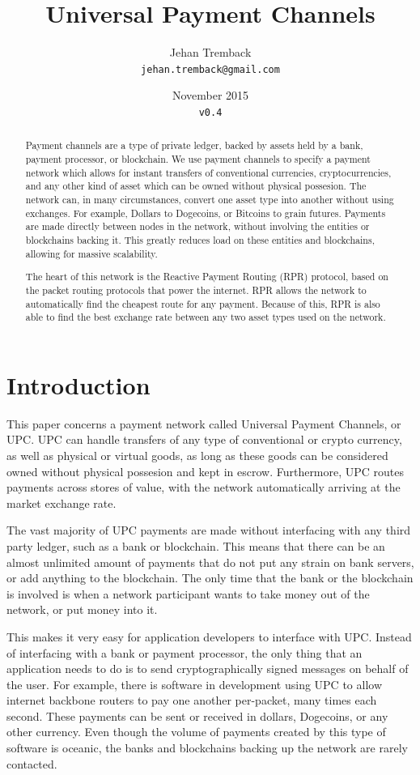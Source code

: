 \documentclass[a4paper]{article}
\title{Universal Payment Channels}
\author{Jehan Tremback\\
\texttt{jehan.tremback@gmail.com}\\}
\date{November 2015\\
\texttt{v0.4}}
\begin{document}
\maketitle

\begin{abstract}
Payment channels are a type of private ledger, backed by assets held by a bank, payment processor, or blockchain. We use payment channels to specify a payment network which allows for instant transfers of conventional currencies, cryptocurrencies, and any other kind of asset which can be owned without physical possesion. The network can, in many circumstances, convert one asset type into another without using exchanges. For example, Dollars to Dogecoins, or Bitcoins to grain futures. Payments are made directly between nodes in the network, without involving the entities or blockchains backing it. This greatly reduces load on these entities and blockchains, allowing for massive scalability.

The heart of this network is the Reactive Payment Routing (RPR) protocol, based on the packet routing protocols that power the internet. RPR allows the network to automatically find the cheapest route for any payment. Because of this, RPR is also able to find the best exchange rate between any two asset types used on the network.
\end{abstract}

\section*{Introduction}

This paper concerns a payment network called Universal Payment Channels, or UPC. UPC can handle transfers of any type of conventional or crypto currency, as well as physical or virtual goods, as long as these goods can be considered owned without physical possesion and kept in escrow. Furthermore, UPC routes payments across stores of value, with the network automatically arriving at the market exchange rate.

The vast majority of UPC payments are made without interfacing with any third party ledger, such as a bank or blockchain. This means that there can be an almost unlimited amount of payments that do not put any strain on bank servers, or add anything to the blockchain. The only time that the bank or the blockchain is involved is when a network participant wants to take money out of the network, or put money into it.

This makes it very easy for application developers to interface with UPC. Instead of interfacing with a bank or payment processor, the only thing that an application needs to do is to send cryptographically signed messages on behalf of the user. For example, there is software in development using UPC to allow internet backbone routers to pay one another per-packet, many times each second. These payments can be sent or received in dollars, Dogecoins, or any other currency. Even though the volume of payments created by this type of software is oceanic, the banks and blockchains backing up the network are rarely contacted.
\end{document}
